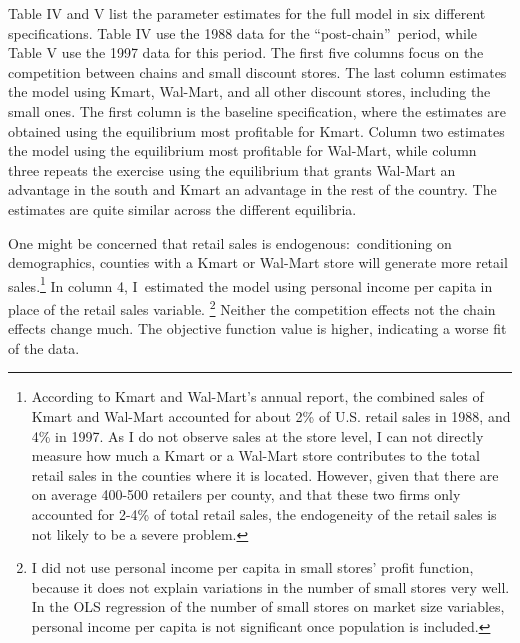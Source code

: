 \documentclass[notitlepage,onecolumn,11pt]{article}
\begin{document}
Table IV and V list the parameter estimates for the full model in six
different specifications. Table IV use the 1988 data for the
\textquotedblleft post-chain\textquotedblright\ period, while Table V use
the 1997 data for this period. The first five columns focus on the
competition between chains and small discount stores. The last column
estimates the model using Kmart, Wal-Mart, and all other discount stores,
including the small ones. The first column is the baseline specification,
where the estimates are obtained using the equilibrium most profitable for
Kmart. Column two estimates the model using the equilibrium most profitable
for Wal-Mart, while column three repeats the exercise using the equilibrium
that grants Wal-Mart an advantage in the south and Kmart an advantage in the
rest of the country. The estimates are quite similar across the different
equilibria.

One might be concerned that retail sales is endogenous:\ conditioning on
demographics, counties with a Kmart or Wal-Mart store will generate more
retail sales.\footnote{%
According to Kmart and Wal-Mart's annual report, the combined sales of Kmart
and Wal-Mart accounted for about 2\% of U.S. retail sales in 1988, and 4\%
in 1997. As I do not observe sales at the store level, I can not directly
measure how much a Kmart or a Wal-Mart store contributes to the total retail
sales in the counties where it is located. However, given that there are on
average 400-500 retailers per county, and that these two firms only
accounted for 2-4\% of total retail sales, the endogeneity of the retail
sales is not likely to be a severe problem.} In column 4, I\ estimated the
model using personal income per capita in place of the retail sales variable.%
\footnote{%
I did not use personal income per capita in small stores' profit function,
because it does not explain variations in the number of small stores very
well. In the OLS regression of the number of small stores on market size
variables, personal income per capita is not significant once population is
included.} Neither the competition effects not the chain effects change
much. The objective function value is higher, indicating a worse fit of the
data.
\end{document}
